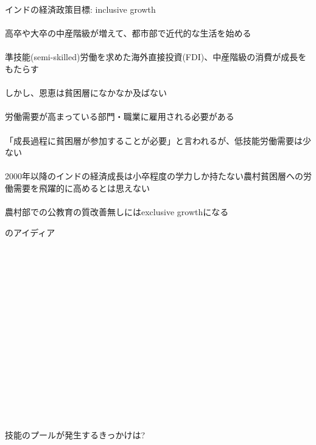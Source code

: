 \begin{frame}{}
インドの経済政策目標: inclusive growth\\~\\
\pause
高卒や大卒の中産階級が増えて、都市部で近代的な生活を始める\\~\\
\pause
準技能(semi-skilled)労働を求めた海外直接投資(FDI)、中産階級の消費が成長をもたらす
\\~\\
\pause
しかし、恩恵は貧困層になかなか及ばない\\~\\
\pause
労働需要が高まっている部門・職業に雇用される必要がある\\~\\
\pause
「成長過程に貧困層が参加することが必要」と言われるが、低技能労働需要は少ない\\~\\
\pause
2000年以降のインドの経済成長は小卒程度の学力しか持たない農村貧困層への労働需要を飛躍的に高めるとは思えない\\~\\
\pause
農村部での公教育の質改善無しにはexclusive growthになる
\end{frame}

\begin{frame}{}
\citet{Tinbergen1975, KatzMurphy1992, Acemoglu1998, Acemoglu2002, GoldinKatz2009}のアイディア\\~\\
\pause
\hfil {}\\~\\
\pause
\hfil {} \\~\\
\hfil {}\\
\hfil {}\\~\\
\pause
\hfil {} \\~\\
\hfil {}\\~\\
\pause
\hfil {} \\~\\
\hfil {}\\~\\

\pause
技能のプールが発生するきっかけは?
\end{frame}

